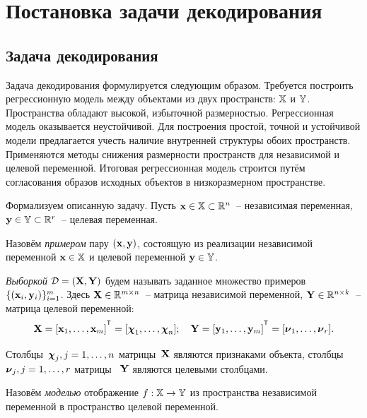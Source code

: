 \chapter{Постановка задачи декодирования}


\section{Задача декодирования}

Задача декодирования формулируется следующим образом. 
Требуется построить регрессионную модель между объектами из двух пространств: $\mathbb{X}$ и $\mathbb{Y}$.
Пространства обладают высокой, избыточной размерностью. 
Регрессионная модель оказывается неустойчивой.
Для построения простой, точной и устойчивой модели предлагается учесть наличие внутренней структуры обоих пространств. 
Применяются методы снижения размерности пространств для независимой и целевой переменной. 
Итоговая регрессионная модель строится путём согласования образов исходных объектов в низкоразмерном пространстве. 

Формализуем описанную задачу. 
Пусть $\mathbf{x} \in \mathbb{X} \subset \mathbb{R}^n$~-- независимая переменная, $\mathbf{y} \in \mathbb{Y} \subset \mathbb{R}^r$~-- целевая переменная.

\begin{definition}
	Назовём \textit{примером} пару $(\mathbf{x}, \mathbf{y})$, состоящую из реализации независимой переменной $\mathbf{x} \in \mathbb{X}$ и целевой переменной $\mathbf{y} \in \mathbb{Y}$. 
\end{definition}

\begin{definition}
	\textit{Выборкой} $\mathcal{D}=(\mathbf{X}, \mathbf{Y})$ будем называть заданное множество примеров $\{(\mathbf{x}_i, \mathbf{y}_i)\}_{i=1}^m$. Здесь $\mathbf{X} \in \mathbb{R}^{m \times n}$~-- матрица независимой переменной, $\mathbf{Y} \in \mathbb{R}^{n \times k}$~-- матрица целевой переменной:
	\begin{equation*}
	\bX = [\bx_1, \dots, \bx_m]^{\T} =  [\bchi_1, \dots, \bchi_n]; \quad \bY = [\by_1, \dots, \by_m]^{\T} =  [\bnu_1, \dots, \bnu_r].
	\end{equation*}
	
	Столбцы~$\boldsymbol{\chi}_j, j=1, \dots, n$ матрицы~$\mathbf{X}$ являются признаками объекта, столбцы~$\boldsymbol{\nu}_j, j=1, \dots, r$ матрицы ~$\mathbf{Y}$ являются целевыми столбцами.
	
\end{definition}

\begin{definition}
Назовём \textit{моделью} отображение $f: \mathbb{X} \rightarrow \mathbb{Y}$ из пространства независимой переменной в пространство целевой переменной.
\end{definition}

